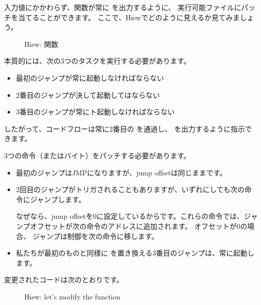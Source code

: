 

\clearpage
{}

入力値にかかわらず、関数が常に を出力するように、
実行可能ファイルにパッチを当てることができます。 
ここで、Hiewでどのように見えるか見てみましょう。

\begin{figure}[H]
\centering
{}
\caption{Hiew:  関数}
\label{fig:jcc_hiew_1}
\end{figure}

本質的には、次の3つのタスクを実行する必要があります。
\begin{itemize}
\item 最初のジャンプが常に起動しなければならない
\item 2番目のジャンプが決して起動してはならない
\item 3番目のジャンプが常にト起動しなければならない
\end{itemize}

したがって、コードフローは常に2番目の \printf を通過し、 を出力するように指示できます。 

3つの命令（またはバイト）をパッチする必要があります。

\begin{itemize}
\item 最初のジャンプはJMPになりますが、\gls{jump offset}は同じままです。

\item 
2回目のジャンプがトリガされることもありますが、いずれにしても次の命令にジャンプします。

なぜなら、\gls{jump offset}を0に設定しているからです。これらの命令では、ジャンプオフセットが次の命令のアドレスに追加されます。 
オフセットが0の場合、
ジャンプは制御を次の命令に移します。

\item 
私たちが最初のものと同様に \JMP を置き換える3番目のジャンプは、常に起動します。

\end{itemize}

\clearpage
変更されたコードは次のとおりです。

\begin{figure}[H]
\centering
{}
\caption{Hiew: let's modify the  function}
\label{fig:jcc_hiew_2}
\end{figure}

